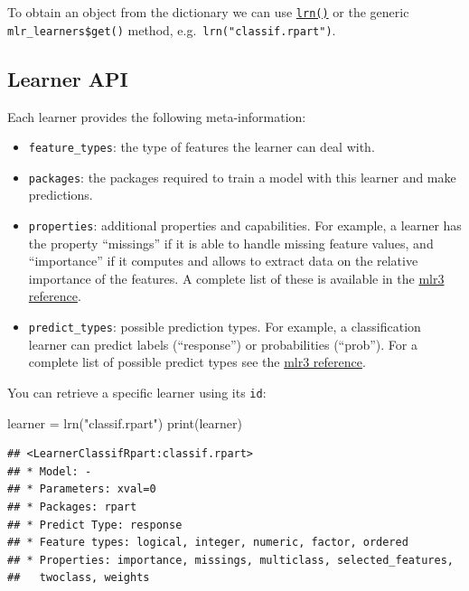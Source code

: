 \documentclass[
]{scrbook}
\newenvironment{Shaded}{\begin{snugshade}}{\end{snugshade}}
\newcommand{\FunctionTok}[1]{\textcolor[rgb]{0.00,0.00,0.00}{#1}}
\newcommand{\NormalTok}[1]{#1}
\newcommand{\OtherTok}[1]{\textcolor[rgb]{0.56,0.35,0.01}{#1}}
\newcommand{\StringTok}[1]{\textcolor[rgb]{0.31,0.60,0.02}{#1}}
\providecommand{\tightlist}{%
  \setlength{\itemsep}{0pt}\setlength{\parskip}{0pt}}
\renewenvironment{Shaded} {\begin{snugshade}\small} {\end{snugshade}}
\begin{document}
To obtain an object from the dictionary we can use \href{https://mlr3.mlr-org.com/reference/mlr_sugar.html}{\texttt{lrn()}} or the generic \texttt{mlr\_learners\$get()} method, e.g.~\texttt{lrn("classif.rpart")}.

\hypertarget{learner-api}{%
\subsection{Learner API}\label{learner-api}}

Each learner provides the following meta-information:

\begin{itemize}
\tightlist
\item
  \texttt{feature\_types}: the type of features the learner can deal with.
\item
  \texttt{packages}: the packages required to train a model with this learner and make predictions.
\item
  \texttt{properties}: additional properties and capabilities.
  For example, a learner has the property ``missings'' if it is able to handle missing feature values, and ``importance'' if it computes and allows to extract data on the relative importance of the features.
  A complete list of these is available in the \href{https://mlr3.mlr-org.com/reference/mlr_reflections.html\#examples}{mlr3 reference}.
\item
  \texttt{predict\_types}: possible prediction types. For example, a classification learner can predict labels (``response'') or probabilities (``prob''). For a complete list of possible predict types see the \href{https://mlr3.mlr-org.com/reference/mlr_reflections.html\#examples}{mlr3 reference}.
\end{itemize}

You can retrieve a specific learner using its \texttt{id}:

\begin{Shaded}
\begin{Highlighting}[]
\NormalTok{learner }\OtherTok{=} \FunctionTok{lrn}\NormalTok{(}\StringTok{"classif.rpart"}\NormalTok{)}
\FunctionTok{print}\NormalTok{(learner)}
\end{Highlighting}
\end{Shaded}

\begin{verbatim}
## <LearnerClassifRpart:classif.rpart>
## * Model: -
## * Parameters: xval=0
## * Packages: rpart
## * Predict Type: response
## * Feature types: logical, integer, numeric, factor, ordered
## * Properties: importance, missings, multiclass, selected_features,
##   twoclass, weights
\end{verbatim}
\end{document}
